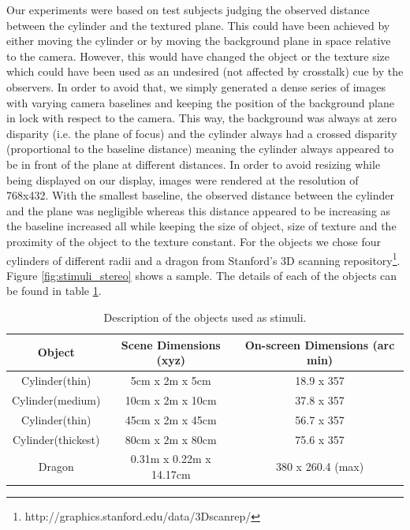 Our experiments were based on test subjects judging the observed distance between the cylinder and the textured plane. This could have been achieved by either moving the cylinder or by moving the background plane in space relative to the camera. However, this would have changed the object or the texture size which could have been used as an undesired (not affected by crosstalk) cue by the observers. In order to avoid that, we simply generated a dense series of images with varying camera baselines and keeping the position of the background plane in lock with respect to the camera. This way, the background was always at zero disparity (i.e. the plane of focus) and the cylinder always had a crossed disparity (proportional to the baseline distance) meaning the cylinder always appeared to be in front of the plane at different distances. In order to avoid resizing while being displayed on our display, images were rendered at the resolution of 768x432. With the smallest baseline, the observed distance between the cylinder and the plane was negligible whereas this distance appeared to be increasing as the baseline increased all while keeping the size of object, size of texture and the proximity of the object to the texture constant. For the objects we chose four cylinders of different radii and a dragon from Stanford's 3D scanning repository\footnote{http://graphics.stanford.edu/data/3Dscanrep/}. Figure \ref{fig:stimuli_stereo} shows a sample. The details of each of the objects can be found in table \ref{tab:stimili_desc}.
\begin{table}[ht!]
  \begin{center}
    \caption{Description of the objects used as stimuli.}
    \label{tab:stimili_desc}
    \begin{tabular}{ccc}
      \toprule
      Object & Scene Dimensions (xyz) & On-screen Dimensions (arc min)\\
      \midrule
      Cylinder(thin) & 5cm x 2m x 5cm & 18.9 x 357\\
      Cylinder(medium) & 10cm x 2m x 10cm & 37.8 x 357\\
      Cylinder(thin) & 45cm x 2m x 45cm & 56.7 x 357\\
      Cylinder(thickest) & 80cm x 2m x 80cm & 75.6 x 357 \\
      Dragon & 0.31m x 0.22m x 14.17cm & 380 x 260.4 (max) \\
      \bottomrule
    \end{tabular}
  \end{center}
\end{table}

